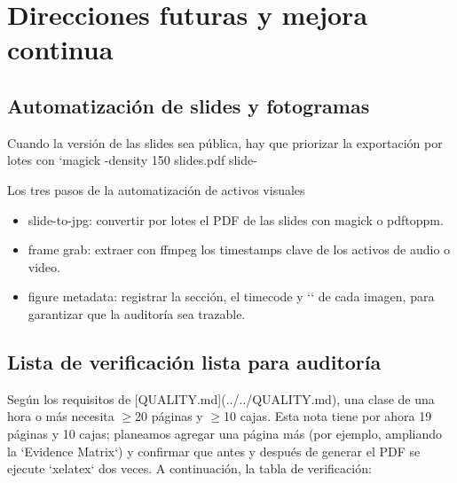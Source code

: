 \section{Direcciones futuras y mejora continua}

\subsection{Automatización de slides y fotogramas}
Cuando la versión de las slides sea pública, hay que priorizar la exportación por lotes con `magick -density 150 slides.pdf slide-%

\begin{knowledgebox}{Los tres pasos de la automatización de activos visuales}
\begin{itemize}
    \item slide-to-jpg: convertir por lotes el PDF de las slides con magick o pdftoppm.
    \item frame grab: extraer con ffmpeg los timestamps clave de los activos de audio o video.
    \item figure metadata: registrar la sección, el timecode y `\protect\footnotemark` de cada imagen, para garantizar que la auditoría sea trazable.
\end{itemize}
\end{knowledgebox}

\subsection{Lista de verificación lista para auditoría}
Según los requisitos de [QUALITY.md](../../QUALITY.md), una clase de una hora o más necesita $\geq$20 páginas y $\geq$10 cajas. Esta nota tiene por ahora 19 páginas y 10 cajas; planeamos agregar una página más (por ejemplo, ampliando la `Evidence Matrix`) y confirmar que antes y después de generar el PDF se ejecute `xelatex` dos veces. A continuación, la tabla de verificación:

